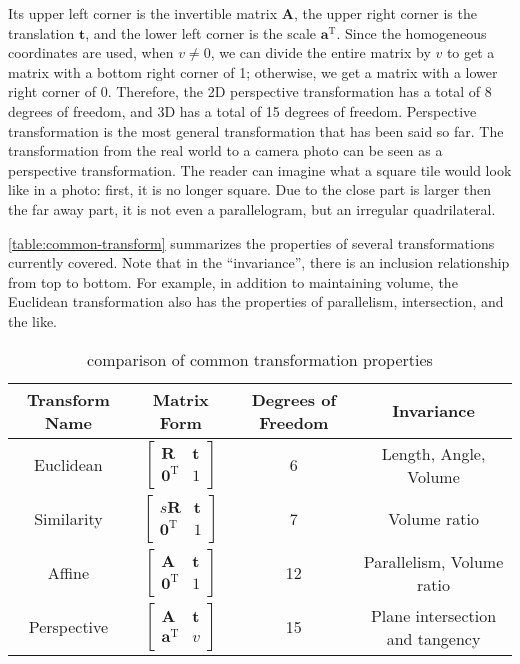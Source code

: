 \begin{enumerate}
	Its upper left corner is the invertible matrix $\mathbf{A}$, the upper right corner is the translation $\mathbf{t}$, and the lower left corner is the scale $\mathbf{a}^\mathrm{T}$. Since the homogeneous coordinates are used, when $v \neq 0$, we can divide the entire matrix by $v$ to get a matrix with a bottom right corner of 1; otherwise, we get a matrix with a lower right corner of $0$. Therefore, the 2D perspective transformation has a total of 8 degrees of freedom, and 3D has a total of 15 degrees of freedom. Perspective transformation is the most general transformation that has been said so far. The transformation from the real world to a camera photo can be seen as a perspective transformation. The reader can imagine what a square tile would look like in a photo: first, it is no longer square. Due to the close part is larger then the far away part, it is not even a parallelogram, but an irregular quadrilateral.
\end{enumerate}

\autoref{table:common-transform} summarizes the properties of several transformations currently covered. Note that in the ``invariance'', there is an inclusion relationship from top to bottom. For example, in addition to maintaining volume, the Euclidean transformation also has the properties of parallelism, intersection, and the like.

\begin{table}[!htp]
	\centering
	\caption{comparison of common transformation properties}
	\label{table:common-transform}
	\small
	\begin{tabular}{c|c|c|c}
		\toprule
		Transform Name & Matrix Form & Degrees of Freedom & Invariance \\ \midrule
		Euclidean \rule{0pt}{20 pt} & $\left[ {\begin{array}{*{20}{c}}
			\mathbf{R} & \mathbf{t}\\
			{{\mathbf{0}^\mathrm{T}}}&1
			\end{array}} \right]$ & 6 & Length, Angle, Volume \\
		Similarity \rule{0pt}{20 pt}& $ \left[ {\begin{array}{*{20}{c}}
			{s \mathbf{R}}& \mathbf{t}\\
			{{ \mathbf{0}^\mathrm{T}}}&1
			\end{array}} \right]$ & 7 & Volume ratio \\
		Affine \rule{0pt}{20 pt}& $ \left[ {\begin{array}{*{20}{c}}
			\mathbf{A} & \mathbf{t}\\
			{{\mathbf{0}^\mathrm{T}}} & 1
			\end{array}} \right]$ & 12 & Parallelism, Volume ratio \\
		Perspective \rule{0pt}{20 pt} & $ \left[ {\begin{array}{*{20}{c}}
			\mathbf{A} & \mathbf{t}\\
			{{\mathbf{a}^\mathrm{T}}} & v
			\end{array}} \right]$ & 15 & Plane intersection and tangency \rule{0pt}{20 pt}\\
		\bottomrule
	\end{tabular}
\end{table}

